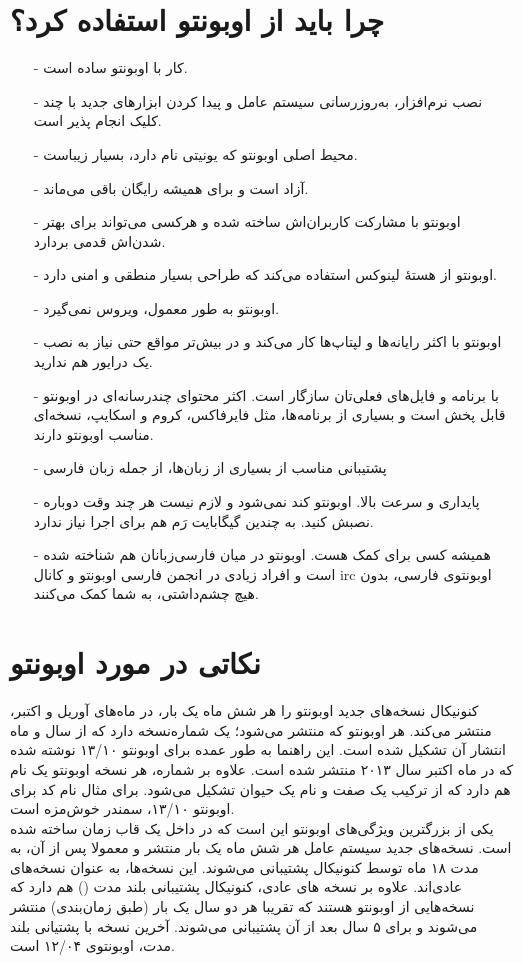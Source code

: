 \section{چرا باید از اوبونتو استفاده کرد؟}
\begin{itemize}
\item[-] کار با اوبونتو ساده است.
\item[-] نصب نرم‌افزار، به‌روزرسانی سیستم عامل و پیدا کردن ابزارهای جدید با چند کلیک انجام پذیر است.
\item[-] محیط اصلی اوبونتو که یونیتی نام دارد، بسیار زیباست.
\item[-] آزاد است و برای همیشه رایگان باقی می‌ماند.
\item[-] اوبونتو با مشارکت کاربران‌اش ساخته شده و هرکسی می‌تواند برای بهتر شدن‌اش قدمی بردارد.
\item[-] اوبونتو از هستهٔ لینوکس استفاده می‌کند که طراحی بسیار منطقی و امنی دارد.
\item[-] اوبونتو به طور معمول، ویروس نمی‌گیرد.
\item[-] اوبونتو با اکثر رایانه‌ها و لپتاپ‌ها کار می‌کند و در بیش‌تر مواقع حتی نیاز به نصب یک درایور هم ندارید.
\item[-] با برنامه و فایل‌های فعلی‌تان سازگار است. اکثر محتوای چندرسانه‌ای در اوبونتو قابل پخش است و بسیاری از برنامه‌ها، مثل فایرفاکس، کروم و اسکایپ، نسخه‌ای مناسب اوبونتو دارند.
\item[-] پشتیبانی مناسب از بسیاری از زبان‌ها، از جمله زبان فارسی
\item[-] پایداری و سرعت بالا. اوبونتو کند نمی‌شود و لازم نیست هر چند وقت دوباره نصبش کنید. به چندین گیگابایت رَم هم برای اجرا نیاز ندارد.
\item[-] همیشه کسی برای کمک هست. اوبونتو در میان فارسی‌زبانان هم شناخته شده است و افراد زیادی در انجمن فارسی اوبونتو و کانال irc اوبونتوی فارسی، بدون هیچ چشم‌داشتی، به شما کمک می‌کنند.

\end{itemize}

\section{نکاتی در مورد اوبونتو}
کنونیکال نسخه‌های جدید اوبونتو را هر شش ماه یک بار، در ماه‌های آوریل و اکتبر، منتشر می‌کند. هر اوبونتو که منتشر می‌شود؛ یک شماره‌نسخه دارد که از سال و ماه انتشار آن تشکیل شده است. این راهنما به طور عمده برای اوبونتو ۱۳/۱۰ نوشته شده که در ماه اکتبر سال ۲۰۱۳ منتشر شده است.
علاوه بر شماره، هر نسخه اوبونتو یک نام هم دارد که از ترکیب یک صفت و نام یک حیوان تشکیل می‌شود. برای مثال نام کد برای اوبونتو ۱۳/۱۰، سمندر خوش‌مزه است.\\
یکی از بزرگترین ویژگی‌های اوبونتو این است که در داخل یک قاب زمان ساخته شده است. نسخه‌های جدید سیستم عامل هر شش ماه یک بار منتشر و معمولا پس از آن، به مدت ۱۸ ماه توسط کنونیکال پشتیبانی می‌شوند. این نسخه‌ها، به عنوان نسخه‌های عادی‌اند.
علاوه بر نسخه های عادی، کنونیکال پشتیبانی بلند مدت () هم دارد که نسخه‌هایی از اوبونتو هستند که تقریبا هر دو سال یک بار (طبق زمان‌بندی) منتشر می‌شوند و برای ۵ سال بعد از آن پشتیبانی می‌شوند. آخرین نسخه با پشتیانی بلند مدت، اوبونتوی ۱۲/۰۴ است.
